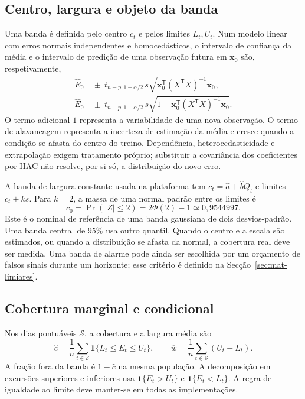 \subsection{Centro, largura e objeto da banda}
\label{sec:mat-tipos-banda}
Uma banda é definida pelo centro $c_t$ e pelos limites $L_t,U_t$. Num modelo linear com erros normais independentes e homocedásticos, o intervalo de confiança da média e o intervalo de predição de uma observação futura em $\boldsymbol x_0$ são, respetivamente,
\begin{align}
\widehat E_0&\ \pm\ t_{n-p,1-\alpha/2}\,s
\sqrt{\boldsymbol x_0^{\mathsf T}(X^{\mathsf T}X)^{-1}\boldsymbol x_0},
\label{eq:mat-ic-media}\\
\widehat E_0&\ \pm\ t_{n-p,1-\alpha/2}\,s
\sqrt{1+\boldsymbol x_0^{\mathsf T}(X^{\mathsf T}X)^{-1}\boldsymbol x_0}.
\label{eq:mat-ip-observacao}
\end{align}
O termo adicional $1$ representa a variabilidade de uma nova observação. O termo de alavancagem representa a incerteza de estimação da média e cresce quando a condição se afasta do centro do treino. Dependência, heterocedasticidade e extrapolação exigem tratamento próprio; substituir a covariância dos coeficientes por HAC não resolve, por si só, a distribuição do novo erro.

A banda de largura constante usada na plataforma tem $c_t=\widehat a+\widehat bQ_t$ e limites $c_t\pm ks$. Para $k=2$, a massa de uma normal padrão entre os limites é
\begin{equation}
c_0=\Pr(|Z|\leq2)=2\Phi(2)-1\simeq0{,}9544997.
\label{eq:mat-dois-sigma}
\end{equation}
Este é o nominal de referência de uma banda gaussiana de dois desvios-padrão. Uma banda central de $95\%$ usa outro quantil. Quando o centro e a escala são estimados, ou quando a distribuição se afasta da normal, a cobertura real deve ser medida. Uma banda de alarme pode ainda ser escolhida por um orçamento de falsos sinais durante um horizonte; esse critério é definido na Secção~\ref{sec:mat-limiares}.

\subsection{Cobertura marginal e condicional}
\label{sec:mat-cobertura}
Nos dias pontuáveis $\mathcal S$, a cobertura e a largura média são
\begin{equation}
\widehat c=\frac1n\sum_{t\in\mathcal S}\mathbf1\{L_t\leq E_t\leq U_t\},
\qquad \overline w=\frac1n\sum_{t\in\mathcal S}(U_t-L_t).
\label{eq:mat-cobertura}
\end{equation}
A fração fora da banda é $1-\widehat c$ na mesma população. A decomposição em excursões superiores e inferiores usa $\mathbf1\{E_t>U_t\}$ e $\mathbf1\{E_t<L_t\}$. A regra de igualdade ao limite deve manter-se em todas as implementações.

